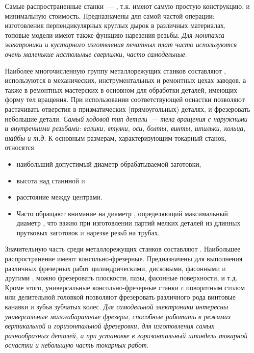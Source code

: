 \label{stanki}
\secdown

Самые распространенные станки\ --- , т.к. имеют самую простую
конструкцию, и минимальную стоимость. Предназначены для самой частой операции:
изготовления перпендикулярных круглых дырок в различных материалах, топовые
модели имеют также функцию нарезения резьбы. \emph{Для монтажа электроники и
кустарного изготвления печатных плат часто используются очень
маленькие настольные сверлилки, часто самодельные}.

\bigskip

Наиболее многочисленную группу металлорежущих станков составляют
, используются в механических, инструментальных
и ремонтных цехах заводов, а также в ремонтных мастерских в основном для
обработки деталей, имеющих форму тел вращения. При использовании соответствующей
оснастки позволяют растачивать отверстия в призматических (прямоугольных)
деталях, и фрезеровать небольшие детали. \emph{Самый ходовой тип детали\ ---
тела вращения с наружними и внутренними резьбами: валики, втулки, оси, болты, винты,
шпильки, кольца, шайбы и т.д.}
К основным размерам, характеризующим токарный станок, относятся
\begin{itemize}
  \item наибольший допустимый диаметр обрабатываемой заготовки,
  \item высота  над станиной и
  \item расстояние между центрами.
  \item
Часто обращают внимание на диаметр ,
определяющий максимальный диаметр , что важно при
изготовлении партий мелких деталей из длинных прутковых заготовок и нарезке
резьб на трубах.
\end{itemize}

\bigskip

Значительную часть среди металлорежущих станков составляют . Наибольшее распространение имеют консольно-фрезерные.
Предназначены для выполнения различных фрезерных работ цилиндрическими,
дисковыми, фасонными и другими , можно фрезеровать плоскости,
пазы, фасонные поверхности, и т.д. Кроме этого, универсальные
консольно-фрезерные станки c поворотным столом или делительной головкой
позволяют фрезеровать различного рода винтовые канавки и зубья зубчатых колес.
\emph{Для самодельной электроники интересны универсальные малогабаритные
фрезеры, способные работать в режимах вертикальной и горизонтальной фрезеровки,
для изготовления самых разнообразных деталей, а при установке в
горизонтальный шпиндель токарной оснастки и небольшую часть токарных работ}.

